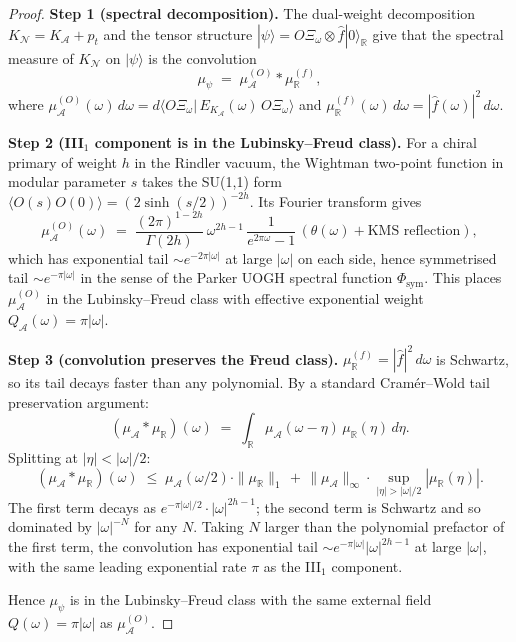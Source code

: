\documentclass[11pt]{amsart}
\theoremstyle{remark}
\newcommand{\NN}{\mathcal{N}}
\newcommand{\AA}{\mathcal{A}}
\newcommand{\R}{\mathbb{R}}
\begin{document}
\begin{proof}
\textbf{Step 1 (spectral decomposition).} The dual-weight decomposition
$K_\NN=K_\AA+p_t$ and the tensor structure $|\psi\rangle=O\Xi_\omega\otimes
\hat f|0\rangle_\R$ give that the spectral measure of $K_\NN$ on
$|\psi\rangle$ is the convolution
\[
\mu_\psi \;=\; \mu_\AA^{(O)} * \mu_\R^{(f)},
\]
where $\mu_\AA^{(O)}(\omega)\,d\omega = d\langle O\Xi_\omega|\,
E_{K_\AA}(\omega)\,O\Xi_\omega\rangle$ and
$\mu_\R^{(f)}(\omega)\,d\omega = |\hat f(\omega)|^2\,d\omega$.

\textbf{Step 2 (III$_1$ component is in the Lubinsky--Freud class).}
For a chiral primary of weight $h$ in the Rindler vacuum, the Wightman
two-point function in modular parameter $s$ takes the SU(1,1) form
$\langle O(s)O(0)\rangle = (2\sinh(s/2))^{-2h}$. Its Fourier transform
gives
\[
\mu_\AA^{(O)}(\omega) \;=\;
\frac{(2\pi)^{1-2h}}{\Gamma(2h)}
\,\omega^{2h-1}\,
\frac{1}{e^{2\pi\omega}-1}\,(\theta(\omega)+\text{KMS reflection}),
\]
which has exponential tail $\sim e^{-2\pi|\omega|}$ at large $|\omega|$
on each side, hence symmetrised tail $\sim e^{-\pi|\omega|}$ in the
sense of the Parker UOGH spectral function $\Phi_{\mathrm{sym}}$. This
places $\mu_\AA^{(O)}$ in the Lubinsky--Freud class with effective
exponential weight $Q_\AA(\omega)=\pi|\omega|$.

\textbf{Step 3 (convolution preserves the Freud class).}
$\mu_\R^{(f)}=|\hat f|^2\,d\omega$ is Schwartz, so its tail decays
faster than any polynomial. By a standard Cram\'er--Wold tail
preservation argument:
\[
(\mu_\AA * \mu_\R)(\omega)
\;=\;
\int_\R \mu_\AA(\omega-\eta)\,\mu_\R(\eta)\,d\eta.
\]
Splitting at $|\eta|<|\omega|/2$:
\[
(\mu_\AA*\mu_\R)(\omega) \;\le\; \mu_\AA(\omega/2)\cdot\|\mu_\R\|_1
\,+\, \|\mu_\AA\|_\infty\cdot\sup_{|\eta|>|\omega|/2}|\mu_\R(\eta)|.
\]
The first term decays as $e^{-\pi|\omega|/2}\cdot|\omega|^{2h-1}$;
the second term is Schwartz and so dominated by
$|\omega|^{-N}$ for any $N$. Taking $N$ larger than the polynomial
prefactor of the first term, the convolution has exponential tail
$\sim e^{-\pi|\omega|}|\omega|^{2h-1}$ at large $|\omega|$, with the
same leading exponential rate $\pi$ as the III$_1$ component.

Hence $\mu_\psi$ is in the Lubinsky--Freud class with the same external
field $Q(\omega)=\pi|\omega|$ as $\mu_\AA^{(O)}$.


\end{proof}
\end{document}
